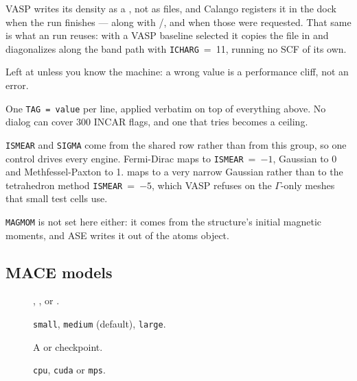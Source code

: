 \begin{description}
    VASP writes its density as a , not as  files, and
    Calango registers it in the  dock when the run
    finishes --- along with /,  and
     when those were requested. That same  is what
    an \menusep{} run reuses: with
    a VASP baseline selected it copies the file in and diagonalizes along the
    band path with \texttt{ICHARG}~=~11, running no SCF of its own.
  \item[\ui{NCORE} / \ui{KPAR}] Left at  unless you know the machine:
    a wrong value is a performance cliff, not an error.
  \item[\ui{Extra INCAR tags}] One \texttt{TAG = value} per line, applied
    verbatim on top of everything above. No dialog can cover 300 INCAR flags,
    and one that tries becomes a ceiling.
\end{description}

\begin{calnote}
\texttt{ISMEAR} and \texttt{SIGMA} come from the shared 
row rather than from this group, so one control drives every engine.
Fermi-Dirac maps to \texttt{ISMEAR}~=~$-1$, Gaussian to 0 and
Methfessel-Paxton to 1.  maps to a very narrow Gaussian rather than to
the tetrahedron method \texttt{ISMEAR}~=~$-5$, which VASP refuses on the
$\Gamma$-only meshes that small test cells use.

\texttt{MAGMOM} is not set here either: it comes from the structure's initial
magnetic moments, and ASE writes it out of the atoms object.
\end{calnote}

\subsection{MACE models}

\begin{description}
  \item[] ,
    , or
    .
  \item[] \texttt{small}, \texttt{medium} (default),
    \texttt{large}.
  \item[] A  or  checkpoint.
  \item[] \texttt{cpu}, \texttt{cuda} or \texttt{mps}.
\end{description}

